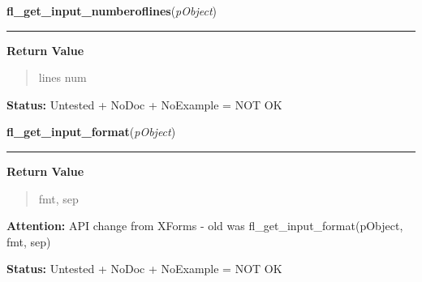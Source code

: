     \vspace{0.5ex}

\hspace{.8\funcindent}\begin{boxedminipage}{\funcwidth}

    \raggedright \textbf{fl\_get\_input\_numberoflines}(\textit{pObject})

    \vspace{-1.5ex}

    \rule{\textwidth}{0.5\fboxrule}
\setlength{\parskip}{2ex}
\setlength{\parskip}{1ex}
      \textbf{Return Value}
    \vspace{-1ex}

      \begin{quote}
      lines num

      \end{quote}

\textbf{Status:} Untested + NoDoc + NoExample = NOT OK



    \end{boxedminipage}

    \label{xformslib:library:fl_get_input_format}

    \vspace{0.5ex}

\hspace{.8\funcindent}\begin{boxedminipage}{\funcwidth}

    \raggedright \textbf{fl\_get\_input\_format}(\textit{pObject})

    \vspace{-1.5ex}

    \rule{\textwidth}{0.5\fboxrule}
\setlength{\parskip}{2ex}
\setlength{\parskip}{1ex}
      \textbf{Return Value}
    \vspace{-1ex}

      \begin{quote}
      fmt, sep

      \end{quote}

\textbf{Attention:} API change from XForms - old was fl\_get\_input\_format(pObject, fmt, sep)



\textbf{Status:} Untested + NoDoc + NoExample = NOT OK



    \end{boxedminipage}

